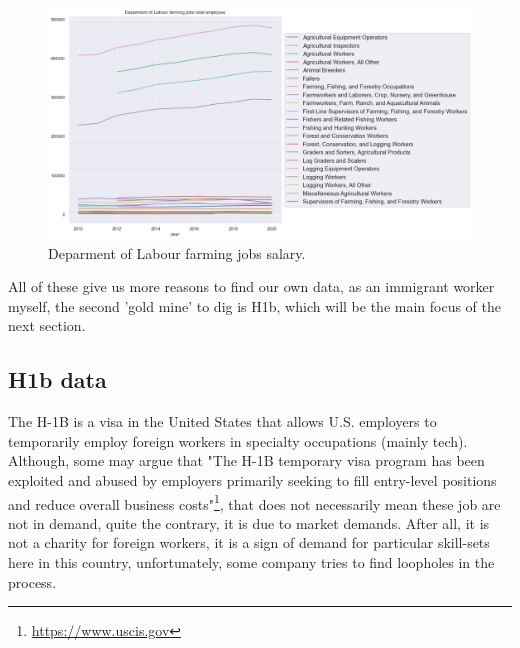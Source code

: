 \begin{figure}[h]
	\begin{center}
		\includegraphics[width=\linewidth]{./photos/dolfarmingsalary.png}
	\end{center}
	\caption{Deparment of Labour farming jobs salary.}
	\label{dolfarmingsalary}
\end{figure}
All of these give us more reasons to find our own data, as an immigrant worker myself, the second 'gold mine' to dig is H1b, which will be the main focus of the next section.
\subsection{H1b data}
The H-1B is a visa in the United States  that allows U.S. employers to temporarily employ foreign workers in specialty occupations (mainly tech). Although, some may argue that "The H-1B temporary visa program has been exploited and abused by employers primarily seeking to fill entry-level positions and reduce overall business costs"\footnote{\url{https://www.uscis.gov}}, that does not necessarily mean these job are not in demand, quite the contrary, it is due to market demands. After all, it is not a charity for foreign workers, it is a sign of demand for particular skill-sets here in this country, unfortunately, some company tries to find loopholes in the process. 
